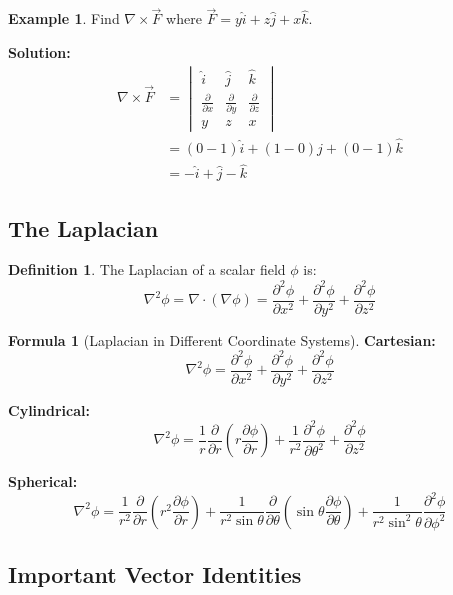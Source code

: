 \documentclass[12pt,a4paper]{article}
\theoremstyle{definition}
\newtheorem{definition}[theorem]{Definition}
\newtheorem{example}[theorem]{Example}
\newtheorem{formula}[theorem]{Formula}
\begin{document}
\begin{example}
Find $\nabla \times \vec{F}$ where $\vec{F} = y\hat{i} + z\hat{j} + x\hat{k}$.

\textbf{Solution:}
\begin{align*}
\nabla \times \vec{F} &= \begin{vmatrix}
\hat{i} & \hat{j} & \hat{k} \\
\frac{\partial}{\partial x} & \frac{\partial}{\partial y} & \frac{\partial}{\partial z} \\
y & z & x
\end{vmatrix} \\
&= \left(0 - 1\right)\hat{i} + \left(1 - 0\right)\hat{j} + \left(0 - 1\right)\hat{k} \\
&= -\hat{i} + \hat{j} - \hat{k}
\end{align*}
\end{example}

\subsection{The Laplacian}

\begin{definition}
The Laplacian of a scalar field $\phi$ is:
\[
\nabla^2\phi = \nabla \cdot (\nabla\phi) = \frac{\partial^2\phi}{\partial x^2} + \frac{\partial^2\phi}{\partial y^2} + \frac{\partial^2\phi}{\partial z^2}
\]
\end{definition}

\begin{formula}[Laplacian in Different Coordinate Systems]
\textbf{Cartesian:}
\[
\nabla^2\phi = \frac{\partial^2\phi}{\partial x^2} + \frac{\partial^2\phi}{\partial y^2} + \frac{\partial^2\phi}{\partial z^2}
\]

\textbf{Cylindrical:}
\[
\nabla^2\phi = \frac{1}{r}\frac{\partial}{\partial r}\left(r\frac{\partial\phi}{\partial r}\right) + \frac{1}{r^2}\frac{\partial^2\phi}{\partial\theta^2} + \frac{\partial^2\phi}{\partial z^2}
\]

\textbf{Spherical:}
\[
\nabla^2\phi = \frac{1}{r^2}\frac{\partial}{\partial r}\left(r^2\frac{\partial\phi}{\partial r}\right) + \frac{1}{r^2\sin\theta}\frac{\partial}{\partial\theta}\left(\sin\theta\frac{\partial\phi}{\partial\theta}\right) + \frac{1}{r^2\sin^2\theta}\frac{\partial^2\phi}{\partial\phi^2}
\]
\end{formula}

\subsection{Important Vector Identities}
\end{document}
